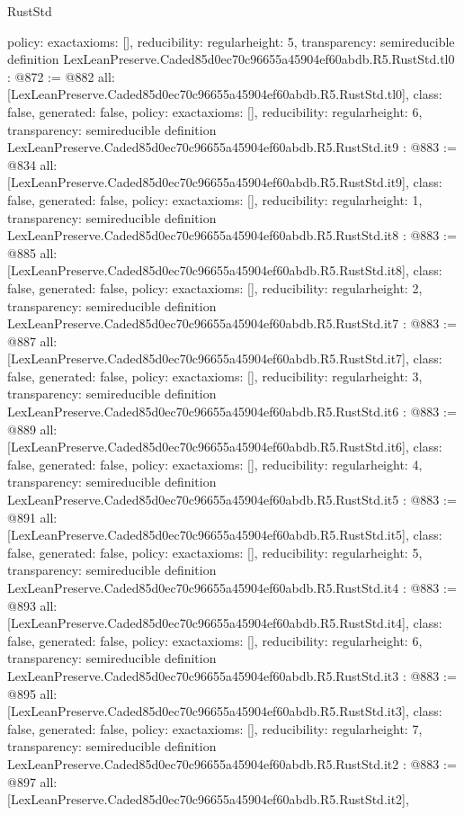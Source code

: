 \begin{lexlean}{RustStd}
\begin{coremodule}
{  policy: exact{axioms: []},
  reducibility: regular{height: 5},
  transparency: semireducible
}
definition LexLeanPreserve.Caded85d0ec70c96655a45904ef60abdb.R5.RustStd.tl0 : @872 := @882 {
  all: [LexLeanPreserve.Caded85d0ec70c96655a45904ef60abdb.R5.RustStd.tl0],
  class: false,
  generated: false,
  policy: exact{axioms: []},
  reducibility: regular{height: 6},
  transparency: semireducible
}
definition LexLeanPreserve.Caded85d0ec70c96655a45904ef60abdb.R5.RustStd.it9 : @883 := @834 {
  all: [LexLeanPreserve.Caded85d0ec70c96655a45904ef60abdb.R5.RustStd.it9],
  class: false,
  generated: false,
  policy: exact{axioms: []},
  reducibility: regular{height: 1},
  transparency: semireducible
}
definition LexLeanPreserve.Caded85d0ec70c96655a45904ef60abdb.R5.RustStd.it8 : @883 := @885 {
  all: [LexLeanPreserve.Caded85d0ec70c96655a45904ef60abdb.R5.RustStd.it8],
  class: false,
  generated: false,
  policy: exact{axioms: []},
  reducibility: regular{height: 2},
  transparency: semireducible
}
definition LexLeanPreserve.Caded85d0ec70c96655a45904ef60abdb.R5.RustStd.it7 : @883 := @887 {
  all: [LexLeanPreserve.Caded85d0ec70c96655a45904ef60abdb.R5.RustStd.it7],
  class: false,
  generated: false,
  policy: exact{axioms: []},
  reducibility: regular{height: 3},
  transparency: semireducible
}
definition LexLeanPreserve.Caded85d0ec70c96655a45904ef60abdb.R5.RustStd.it6 : @883 := @889 {
  all: [LexLeanPreserve.Caded85d0ec70c96655a45904ef60abdb.R5.RustStd.it6],
  class: false,
  generated: false,
  policy: exact{axioms: []},
  reducibility: regular{height: 4},
  transparency: semireducible
}
definition LexLeanPreserve.Caded85d0ec70c96655a45904ef60abdb.R5.RustStd.it5 : @883 := @891 {
  all: [LexLeanPreserve.Caded85d0ec70c96655a45904ef60abdb.R5.RustStd.it5],
  class: false,
  generated: false,
  policy: exact{axioms: []},
  reducibility: regular{height: 5},
  transparency: semireducible
}
definition LexLeanPreserve.Caded85d0ec70c96655a45904ef60abdb.R5.RustStd.it4 : @883 := @893 {
  all: [LexLeanPreserve.Caded85d0ec70c96655a45904ef60abdb.R5.RustStd.it4],
  class: false,
  generated: false,
  policy: exact{axioms: []},
  reducibility: regular{height: 6},
  transparency: semireducible
}
definition LexLeanPreserve.Caded85d0ec70c96655a45904ef60abdb.R5.RustStd.it3 : @883 := @895 {
  all: [LexLeanPreserve.Caded85d0ec70c96655a45904ef60abdb.R5.RustStd.it3],
  class: false,
  generated: false,
  policy: exact{axioms: []},
  reducibility: regular{height: 7},
  transparency: semireducible
}
definition LexLeanPreserve.Caded85d0ec70c96655a45904ef60abdb.R5.RustStd.it2 : @883 := @897 {
  all: [LexLeanPreserve.Caded85d0ec70c96655a45904ef60abdb.R5.RustStd.it2],
}
\end{coremodule}
\end{lexlean}
